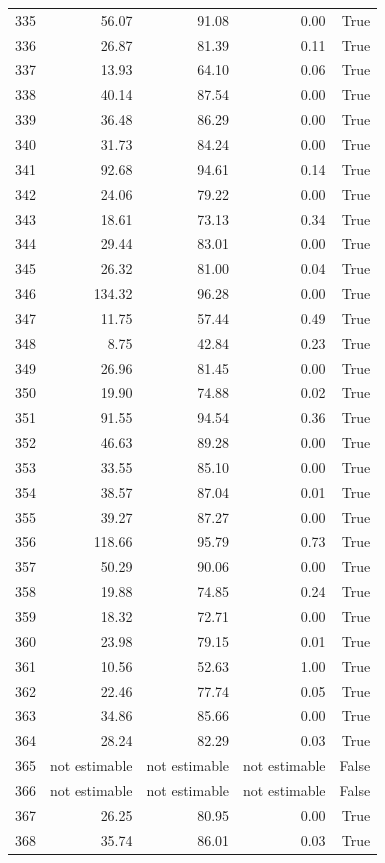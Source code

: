 \begin{longtable}{rrrrr}
335 & 56.07 & 91.08 & 0.00 & True \\
336 & 26.87 & 81.39 & 0.11 & True \\
337 & 13.93 & 64.10 & 0.06 & True \\
338 & 40.14 & 87.54 & 0.00 & True \\
339 & 36.48 & 86.29 & 0.00 & True \\
340 & 31.73 & 84.24 & 0.00 & True \\
341 & 92.68 & 94.61 & 0.14 & True \\
342 & 24.06 & 79.22 & 0.00 & True \\
343 & 18.61 & 73.13 & 0.34 & True \\
344 & 29.44 & 83.01 & 0.00 & True \\
345 & 26.32 & 81.00 & 0.04 & True \\
346 & 134.32 & 96.28 & 0.00 & True \\
347 & 11.75 & 57.44 & 0.49 & True \\
348 & 8.75 & 42.84 & 0.23 & True \\
349 & 26.96 & 81.45 & 0.00 & True \\
350 & 19.90 & 74.88 & 0.02 & True \\
351 & 91.55 & 94.54 & 0.36 & True \\
352 & 46.63 & 89.28 & 0.00 & True \\
353 & 33.55 & 85.10 & 0.00 & True \\
354 & 38.57 & 87.04 & 0.01 & True \\
355 & 39.27 & 87.27 & 0.00 & True \\
356 & 118.66 & 95.79 & 0.73 & True \\
357 & 50.29 & 90.06 & 0.00 & True \\
358 & 19.88 & 74.85 & 0.24 & True \\
359 & 18.32 & 72.71 & 0.00 & True \\
360 & 23.98 & 79.15 & 0.01 & True \\
361 & 10.56 & 52.63 & 1.00 & True \\
362 & 22.46 & 77.74 & 0.05 & True \\
363 & 34.86 & 85.66 & 0.00 & True \\
364 & 28.24 & 82.29 & 0.03 & True \\
365 & not estimable & not estimable & not estimable & False \\
366 & not estimable & not estimable & not estimable & False \\
367 & 26.25 & 80.95 & 0.00 & True \\
368 & 35.74 & 86.01 & 0.03 & True \\

\end{longtable}
